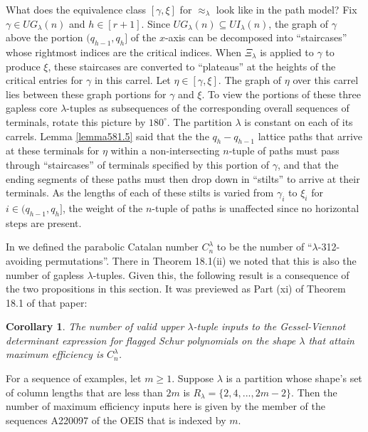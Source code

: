 \documentclass[11pt]{article}
\newtheorem{cor}[thm]{Corollary}
\theoremstyle{definition}
\theoremstyle{remark}
\numberwithin{equation}{section}
\begin{document}
\begin{spacing}{1.35}
What does the equivalence class $[\gamma, \xi]$ for $\approx_\lambda$ look like in the path model?  Fix $\gamma \in UG_\lambda(n)$ and $h \in [r+1]$.  Since $UG_\lambda(n) \subseteq UI_\lambda(n)$, the graph of $\gamma$ above the portion $(q_{h-1}, q_h]$ of the $x$-axis can be decomposed into ``staircases'' whose rightmost indices are the critical indices.  When $\Xi_\lambda$ is applied to $\gamma$ to produce $\xi$, these staircases are converted to ``plateaus'' at the heights of the critical entries for $\gamma$ in this carrel.  Let $\eta \in [\gamma, \xi]$.  The graph of $\eta$ over this carrel lies between these graph portions for $\gamma$ and $\xi$.  To view the portions of these three gapless core $\lambda$-tuples as subsequences of the corresponding overall sequences of terminals, rotate this picture by $180^\circ$.  The partition $\lambda$ is constant on each of its carrels.  Lemma \ref{lemma581.5} said that the the $q_h - q_{h-1}$ lattice paths that arrive at these terminals for $\eta$ within a non-intersecting $n$-tuple of paths must pass through ``staircases'' of terminals specified by this portion of $\gamma$, and that the ending segments of these paths must then drop down in ``stilts'' to arrive at their terminals.  As the lengths of each of these stilts is varied from $\gamma_i$ to $\xi_i$ for $i \in (q_{h-1}, q_h]$, the weight of the $n$-tuple of paths is unaffected since no horizontal steps are present.



In \cite{PW} we defined the parabolic Catalan number $C_n^\lambda$ to be the number of ``$\lambda$-312-avoiding permutations''.  There in Theorem 18.1(ii) we noted that this is also the number of gapless $\lambda$-tuples.  Given this, the following result is a consequence of the two propositions in this section.  It was previewed as Part (xi) of Theorem 18.1 of that paper:

\begin{cor}\label{cor826.12}The number of valid upper $\lambda$-tuple inputs to the Gessel-Viennot determinant expression for flagged Schur polynomials on the shape $\lambda$ that attain maximum efficiency is $C_n^\lambda$.  \end{cor}

\noindent For a sequence of examples, let $m \geq 1$.  Suppose $\lambda$ is a partition whose shape's set of column lengths that are less than $2m$ is $R_\lambda = \{ 2, 4, ... , 2m-2 \}$.  Then the number of maximum efficiency inputs here is given by the member of the sequences A220097 of the OEIS \cite{Slo} that is indexed by $m$.










\end{spacing}
\end{document}
